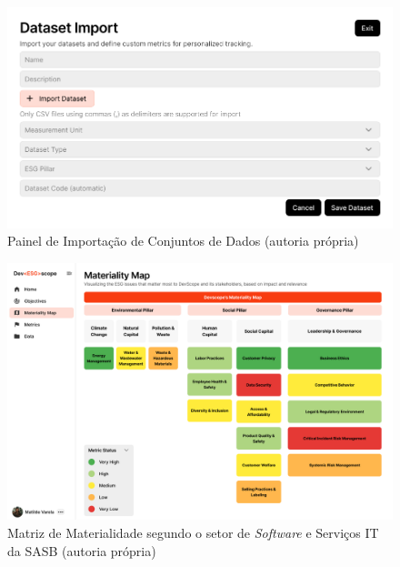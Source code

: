 \begin{figure}[H]
    \centering
    \includegraphics[width=\linewidth]{frontmatter/assets/mockup/Data Import.png}
    \caption{Painel de Importação de Conjuntos de Dados (autoria própria)}
    \label{fig:importDatasetModal}
\end{figure}


\begin{figure}[H]
    \centering
    \includegraphics[width=\linewidth]{frontmatter/assets/mockup/Matrix.png}
    \caption{Matriz de Materialidade segundo o setor de \textit{Software} e Serviços IT da \gls{SASB} (autoria própria)}
    \label{fig:matrixPage}
\end{figure}


